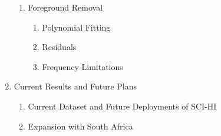 \documentclass[12pt,twoside]{report}
\begin{document}
\begin{enumerate}
\begin{enumerate}
\item Foreground Removal

\begin{enumerate}
\item Polynomial Fitting
\item Residuals
\item Frequency Limitations
\end{enumerate}

\end{enumerate}

\item Current Results and Future Plans

\begin{enumerate}
\item Current Dataset and Future Deployments of SCI-HI
\item Expansion with South Africa
\end{enumerate}

\end{enumerate}




%



%






%
\end{document}
